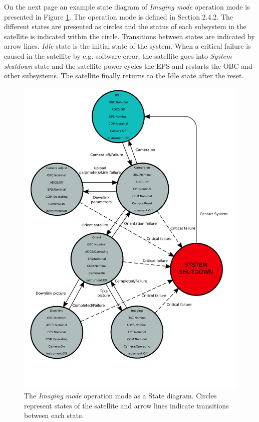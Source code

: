 \documentclass[english,12pt,a4paper,pdftex,elec,utf8]{aaltothesis}
\begin{document}
On the next page an example state diagram of \textit{Imaging mode} operation mode is presented in Figure \ref{imagingstate}. The operation mode is defined in Section 2.4.2. The different states are presented as circles and the status of each subsystem in the satellite is indicated within the circle. Transitions between states are indicated by arrow lines. \textit{Idle} state is the initial state of the system. When a critical failure is caused in the satellite by e.g. software error, the satellite goes into \textit{System shutdown} state and the satellite power cycles the EPS and restarts the OBC and other subsystems. The satellite finally returns to the Idle state after the reset.

\begin{figure}[h!]
\centering
\includegraphics[scale=0.6]{imagingstate}
\caption{The \textit{Imaging mode} operation mode as a State diagram. Circles represent states of the satellite and arrow lines indicate transitions between each state. }
\label{imagingstate}
\end{figure}   
 
\end{document}
